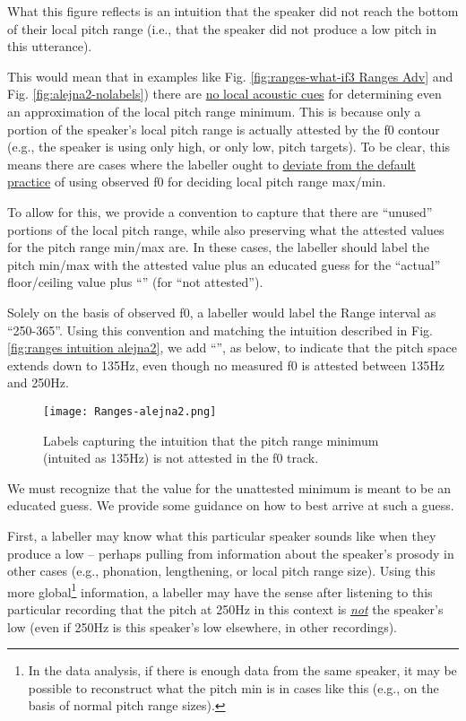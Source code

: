 What this figure reflects is an intuition that the speaker did not reach the bottom of their local pitch range (i.e., that the speaker did not produce a low pitch in this utterance).

This would mean that in examples like Fig. \ref{fig:ranges-what-if3 Ranges Adv} and Fig. \ref{fig:alejna2-nolabels}) there are \uline{no local acoustic cues} for determining even an approximation of the local pitch range minimum. This is because only a portion of the speaker’s local pitch range is actually attested by the f0 contour (e.g., the speaker is using only high, or only low, pitch targets). To be clear, this means there are cases where the labeller ought to \uline{deviate from the default practice} of using observed f0 for deciding local pitch range max\slash min.

To allow for this, we provide a convention to capture that there are “unused” portions of the local pitch range, while also preserving what the attested values for the pitch range min\slash max are. In these cases, the labeller should label the pitch min\slash max with the attested value plus an educated guess for the “actual” floor\slash ceiling value plus “” (for “not attested”).

Solely on the basis of observed f0, a labeller would label the Range interval as “250-365”. Using this convention and matching the intuition described in Fig. \ref{fig:ranges intuition alejna2}, we add “”, as below, to indicate that the pitch space extends down to 135Hz, even though no measured f0 is attested between 135Hz and 250Hz. 

\begin{figure}[H]
\centering
%
\texttt{[image: Ranges-alejna2.png]}
%
\caption{Labels capturing the intuition that the pitch range minimum (intuited as 135Hz) is not attested in the f0 track.%
\label{fig:alejna2 na}%
}
\end{figure}

We must recognize that the value for the unattested minimum is meant to be an educated guess. We provide some guidance on how to best arrive at such a guess.

First, a labeller may know what this particular speaker sounds like when they produce a low – perhaps pulling from information about the speaker’s prosody in other cases (e.g., phonation, lengthening, or local pitch range size). Using this more global\footnote{In the data analysis, if there is enough data from the same speaker, it may be possible to reconstruct what the pitch min is in cases like this (e.g., on the basis of normal pitch range sizes).} information, a labeller may have the sense after listening to this particular recording that the pitch at 250Hz in this context is \emph{\uline{not}} the speaker’s low (even if 250Hz is this speaker’s low elsewhere, in other recordings). 

